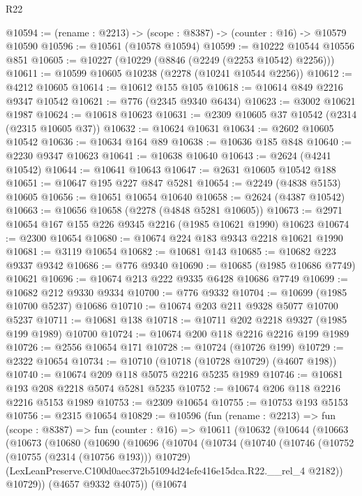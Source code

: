 \begin{lexlean}{R22}
\begin{coremodule}
@10594 := (rename : @2213) -> (scope : @8387) -> (counter : @16) -> @10579 @10590
@10596 := @10561 (@10578 @10594)
@10599 := @10222 @10544 @10556 @851
@10605 := @10227 (@10229 (@8846 (@2249 (@2253 @10542) @2256)))
@10611 := @10599 @10605 @10238 (@2278 (@10241 @10544 @2256))
@10612 := @4212 @10605
@10614 := @10612 @155 @105
@10618 := @10614 @849 @2216 @9347 @10542
@10621 := @776 (@2345 @9340 @6434)
@10623 := @3002 @10621 @1987
@10624 := @10618 @10623
@10631 := @2309 @10605 @37 @10542 (@2314 (@2315 @10605 @37))
@10632 := @10624 @10631
@10634 := @2602 @10605 @10542
@10636 := @10634 @164 @89
@10638 := @10636 @185 @848
@10640 := @2230 @9347 @10623
@10641 := @10638 @10640
@10643 := @2624 (@4241 @10542)
@10644 := @10641 @10643
@10647 := @2631 @10605 @10542 @188
@10651 := @10647 @195 @227 @847 @5281
@10654 := @2249 (@4838 @5153) @10605
@10656 := @10651 @10654 @10640
@10658 := @2624 (@4387 @10542)
@10663 := @10656 @10658 (@2278 (@4848 @5281 @10605))
@10673 := @2971 @10654 @167 @155 @226 @9345 @2216 (@1985 @10621 @1990) @10623
@10674 := @2300 @10654
@10680 := @10674 @224 @183 @9343 @2218 @10621 @1990
@10681 := @3119 @10654
@10682 := @10681 @143
@10685 := @10682 @223 @9337 @9342
@10686 := @776 @9340
@10690 := @10685 (@1985 @10686 @7749) @10621
@10696 := @10674 @213 @222 @9335 @6428 @10686 @7749
@10699 := @10682 @212 @9330 @9334
@10700 := @776 @9332
@10704 := @10699 (@1985 @10700 @5237) @10686
@10710 := @10674 @203 @211 @9328 @5077 @10700 @5237
@10711 := @10681 @138
@10718 := @10711 @202 @2218 @9327 (@1985 @199 @1989) @10700
@10724 := @10674 @200 @118 @2216 @2216 @199 @1989
@10726 := @2556 @10654 @171
@10728 := @10724 (@10726 @199)
@10729 := @2322 @10654
@10734 := @10710 (@10718 (@10728 @10729) (@4607 @198))
@10740 := @10674 @209 @118 @5075 @2216 @5235 @1989
@10746 := @10681 @193 @208 @2218 @5074 @5281 @5235
@10752 := @10674 @206 @118 @2216 @2216 @5153 @1989
@10753 := @2309 @10654
@10755 := @10753 @193 @5153
@10756 := @2315 @10654
@10829 := @10596
    (fun (rename : @2213) =>
    fun (scope : @8387) =>
    fun (counter : @16) =>
    @10611
      (@10632
        (@10644
          (@10663
            (@10673
              (@10680
                (@10690
                  (@10696
                    (@10704
                      (@10734
                        (@10740
                          (@10746
                            (@10752 (@10755 (@2314 (@10756 @193))) @10729)
                            (LexLeanPreserve.C100d0aec372b51094d24efe416e15dca.R22.__rel_4 @2182))
                          @10729))
                      (@4657 @9332 @4075))
                    (@10674

\end{coremodule}
\end{lexlean}
